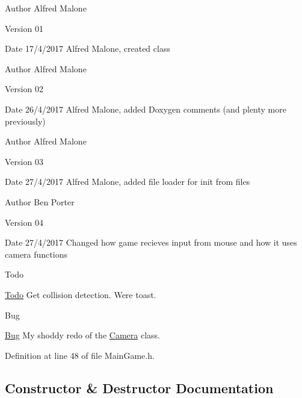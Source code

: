 \begin{DoxyAuthor}{Author}
Alfred Malone 
\end{DoxyAuthor}
\begin{DoxyVersion}{Version}
01 
\end{DoxyVersion}
\begin{DoxyDate}{Date}
17/4/2017 Alfred Malone, created class
\end{DoxyDate}
\begin{DoxyAuthor}{Author}
Alfred Malone 
\end{DoxyAuthor}
\begin{DoxyVersion}{Version}
02 
\end{DoxyVersion}
\begin{DoxyDate}{Date}
26/4/2017 Alfred Malone, added Doxygen comments (and plenty more previously)
\end{DoxyDate}
\begin{DoxyAuthor}{Author}
Alfred Malone 
\end{DoxyAuthor}
\begin{DoxyVersion}{Version}
03 
\end{DoxyVersion}
\begin{DoxyDate}{Date}
27/4/2017 Alfred Malone, added file loader for init from files
\end{DoxyDate}
\begin{DoxyAuthor}{Author}
Ben Porter 
\end{DoxyAuthor}
\begin{DoxyVersion}{Version}
04 
\end{DoxyVersion}
\begin{DoxyDate}{Date}
27/4/2017 Changed how game recieves input from mouse and how it uses camera functions 
\end{DoxyDate}
\begin{DoxyRefDesc}{Todo}
\item[\hyperlink{todo__todo000003}{Todo}]Get collision detection. We\textquotesingle{}re toast.\end{DoxyRefDesc}


\begin{DoxyRefDesc}{Bug}
\item[\hyperlink{bug__bug000006}{Bug}]My shoddy redo of the \hyperlink{class_camera}{Camera} class. \end{DoxyRefDesc}


Definition at line 48 of file Main\+Game.\+h.



\subsection{Constructor \& Destructor Documentation}
\hypertarget{class_main_game_a6269052f9ac8ab60efd1f0d0e4281bb7}{}

